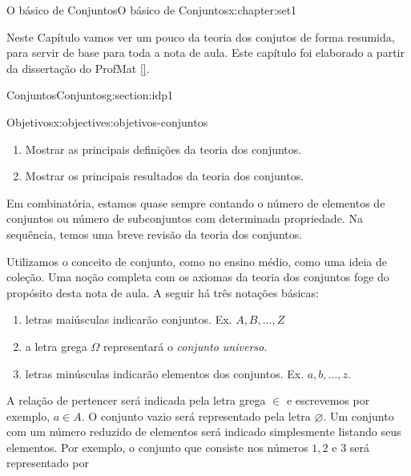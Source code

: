 \documentclass[oneside,10pt,]{book}
\newcommand{\xreffont}{\relax}
\numberwithin{equation}{section}
\begin{document}
\begin{chapterptx}{O básico de Conjuntos}{}{O básico de Conjuntos}{}{}{x:chapter:set1}
\begin{introduction}{}%
Neste Capítulo vamos ver um pouco da teoria dos conjutos de forma resumida, para servir de base para toda a nota de aula. Este capítulo foi elaborado a partir da dissertação do ProfMat \hyperlink{x:biblio:luiz}{[{\xreffont 6.9}]}.%
\end{introduction}%
%
%
\typeout{************************************************}
\typeout{************************************************}
%
\begin{sectionptx}{Conjuntos}{}{Conjuntos}{}{}{g:section:idp1}
\begin{objectives}{Objetivos}{x:objectives:objetivos-conjuntos}
%
\begin{enumerate}
\item{}Mostrar as principais definições da teoria dos conjuntos.%
\item{}Mostrar os principais resultados da teoria dos conjuntos.%
\end{enumerate}
\end{objectives}
\begin{introduction}{}%
Em combinatória, estamos quase sempre contando o número de elementos de conjuntos ou número de subconjuntos com determinada propriedade. Na sequência, temos uma breve revisão da teoria dos conjuntos.%
\end{introduction}%
Utilizamos o conceito de conjunto, como no ensino médio, como uma ideia de coleção. Uma noção completa com os axiomas da teoria dos conjuntos foge do propósito desta nota de aula. A seguir há três notações básicas:%
\begin{multicols}{1}
\begin{enumerate}[label=\roman*]
\item{}letras maiúsculas indicarão conjuntos. Ex. \(A, B, \ldots, Z\)%
\item{}a letra grega \(\Omega\) representará o \emph{conjunto universo}.%
\item{}letras minúsculas indicarão elementos dos conjuntos. Ex. \(a, b, \ldots, z\).%
\end{enumerate}
\end{multicols}
%
\par
A relação de pertencer será indicada pela letra grega \(\in\) e escrevemos por exemplo, \(a\in A\). O conjunto vazio será representado pela letra \(\varnothing\). Um conjunto com um número reduzido de elementos será indicado simplesmente listando seus elementos. Por exemplo, o conjunto que consiste nos números \(1, 2\) e \(3\) será representado por%

\end{sectionptx}
\end{chapterptx}
\end{document}
